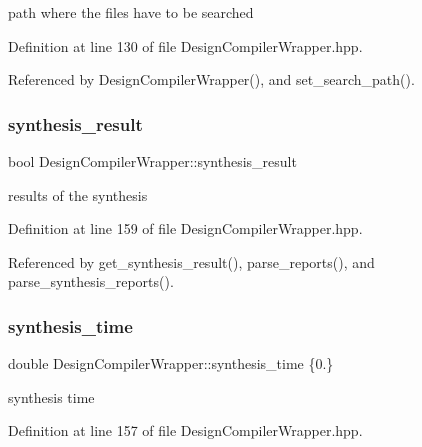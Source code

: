 path where the files have to be searched 



Definition at line 130 of file Design\+Compiler\+Wrapper.\+hpp.



Referenced by Design\+Compiler\+Wrapper(), and set\+\_\+search\+\_\+path().

\mbox{\label{classDesignCompilerWrapper_a798f2d4fc66dd935cfc7c118c3067392}} 
\subsubsection{\texorpdfstring{synthesis\+\_\+result}{synthesis\_result}}
{\footnotesize\ttfamily bool Design\+Compiler\+Wrapper\+::synthesis\+\_\+result\hspace{0.3cm}{\ttfamily [protected]}}



results of the synthesis 



Definition at line 159 of file Design\+Compiler\+Wrapper.\+hpp.



Referenced by get\+\_\+synthesis\+\_\+result(), parse\+\_\+reports(), and parse\+\_\+synthesis\+\_\+reports().

\mbox{\label{classDesignCompilerWrapper_a4e64fa4c3a0ea352f22aa1dd68228d4b}} 
\subsubsection{\texorpdfstring{synthesis\+\_\+time}{synthesis\_time}}
{\footnotesize\ttfamily double Design\+Compiler\+Wrapper\+::synthesis\+\_\+time \{0.\}\hspace{0.3cm}{\ttfamily [protected]}}



synthesis time 



Definition at line 157 of file Design\+Compiler\+Wrapper.\+hpp.



